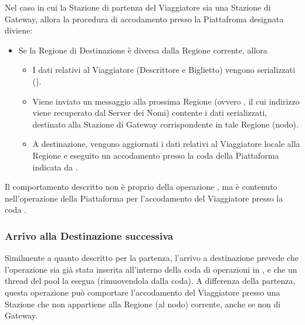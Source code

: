 	Nel caso in cui la Stazione di partenza del Viaggiatore sia una Stazione di Gateway, allora la procedura di accodamento presso la Piattafroma designata diviene:
	\begin{itemize}
		\item Se la Regione di Destinazione  è diversa dalla Regione corrente, allora
			\begin{itemize}
				\item I dati relativi al Viaggiatore (Descrittore e Biglietto) vengono serializzati ().
				\item Viene inviato un messaggio alla prossima Regione (ovvero , il cui indirizzo viene recuperato dal Server dei Nomi) contente i dati serializzati, destinato alla Stazione di Gateway corrispondente in tale Regione (nodo).
				\item A destinazione, vengono aggiornati i dati relativi al Viaggiatore locale alla Regione e eseguito un accodamento presso la coda  della Piattaforma indicata da .
			\end{itemize}
	\end{itemize}
	
	Il comportamento descritto non è proprio della operazione , ma è contenuto nell'operazione della Piattaforma per l'accodamento del Viaggiatore presso la coda . 
	
	
	
	
	\subsubsection{Arrivo alla Destinazione successiva}
		
	Similmente a quanto descritto per la partenza, l'arrivo a destinazione prevede che l'operazione  sia già stata inserita all'interno della coda di operazioni in , e che un thread del pool la esegua (rimuovendola dalla coda). A differenza della partenza, questa operazione può comportare l'accodamento del Viaggiatore presso una Stazione che non appartiene alla Regione (al nodo) corrente, anche se non di Gateway. 
	
